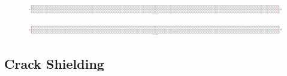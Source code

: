 \documentclass[first,firstsupp,lastsupp,last,hyperref,table]{ETHclass}
\begin{document}
\begin{frame}
\begin{columns}[c]
\begin{column}{0.5\textwidth}
\begin{figure}
\end{figure}
\end{column}
\end{columns}
\centering
\begin{figure}
\centering
\includegraphics[width=1.05\textwidth]{twofibers-sameside-strainmagni101.pdf}
\end{figure}
\vspace{-0.35cm}
\begin{figure}
\centering
\includegraphics[width=1.05\textwidth]{twofibers-oppositeside-strainmagni101.pdf}
\end{figure}
\end{frame}

\subsection{Crack Shielding}
\end{document}
